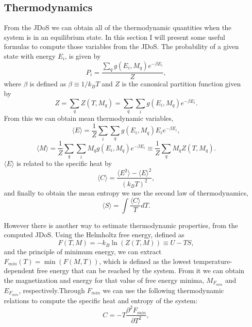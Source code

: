 \subsection{Thermodynamics}

From the JDoS we can obtain all of the thermodynamic quantities when the system is in an equilibrium state. In this section I will present some useful formulas to compute those variables from the JDoS. 
The probability of a given state with energy $E_i$, is given by
\begin{equation}
	P_i = \frac{\sum_q g(E_i, M_q) e^{-\beta E_i}}{Z},
\end{equation}
where $\beta$ is defined as $\beta \equiv 1/k_BT$ and $Z$ is the canonical partition function given by
\begin{equation}
	Z = \sum_q Z(T, M_q) = \sum_q \sum_i g(E_i, M_q) e^{-\beta E_i}.
\end{equation}
From this we can obtain mean thermodynamic variables, 
\begin{equation}
	\langle E \rangle = \frac{1}{Z} \sum_i \sum_q  g(E_i, M_q) E_i e^{-\beta E_i},
\end{equation}
\begin{equation}
	\langle M \rangle  = \frac{1}{Z} \sum_q \sum_i M_q g(E_i, M_q) e^{-\beta E_i} \equiv \frac{1}{Z} \sum_q M_q Z(T, M_q).
\end{equation}
$\langle E \rangle$ is related to the specific heat by 
\begin{equation}
	\langle C \rangle = \frac{\langle E^2 \rangle - \langle E \rangle^2}{\left( k_BT \right)^2},
\end{equation}
and finally to obtain the mean entropy we use the second law of thermodynamics,
\begin{equation}
	\langle S \rangle= \int \frac{\langle C \rangle}{T} dT.
\end{equation}

\pagebreak

However there is another way to estimate thermodynamic properties, from the computed JDoS.  Using the Helmholtz free energy, defined as 
\begin{equation}
	F(T, M) = - k_B \ln(Z(T, M)) \equiv U - TS,
\end{equation}
and the principle of minimum energy, we can extract $F_{min} (T) = \min(F(M, T))$, which is defined as the lowest temperature-dependent free energy that can be reached by the system.
From it we can obtain the magnetization and energy for that value of free energy minima, $M_{F_{min}}$ and $E_{F_{min}}$, respectively.Through $F_{min}$ we can use the following thermodynamic relations to compute the specific heat and entropy of the system:
\begin{equation}\label{C_min}
	C = - T \frac{\partial^2 F_{min}}{\partial T^2},
\end{equation}

